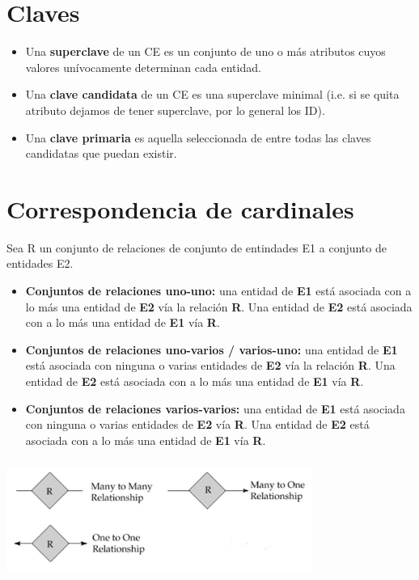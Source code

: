 \documentclass[12pt,a4paper]{report}
\begin{document}
	\section{Claves}
		\begin{itemize}
			\item Una \textbf{superclave} de un CE es un conjunto de uno o más atributos cuyos valores unívocamente determinan cada entidad.
			\item Una \textbf{clave candidata} de un CE es una superclave minimal (i.e. si se quita atributo dejamos de tener superclave, por lo general los ID).
			\item Una \textbf{clave primaria} es aquella seleccionada de entre todas las claves candidatas que puedan existir.
		\end{itemize}
		
	\section{Correspondencia de cardinales}
		\par Sea R un conjunto de relaciones de conjunto de entindades E1 a conjunto de entidades E2.
		\begin{itemize}
			\item \textbf{Conjuntos de relaciones uno-uno:} una entidad de \textbf{E1} está asociada con a lo más una entidad de \textbf{E2} vía la relación \textbf{R}. Una entidad de \textbf{E2} está asociada con a lo más una entidad de \textbf{E1} vía \textbf{R}.
			\item \textbf{Conjuntos de relaciones uno-varios / varios-uno:} una entidad de \textbf{E1} está asociada con ninguna o varias entidades de \textbf{E2} vía la relación \textbf{R}. Una entidad de \textbf{E2} está asociada con a lo más una entidad de \textbf{E1} vía \textbf{R}.
			\item \textbf{Conjuntos de relaciones varios-varios:} una entidad de \textbf{E1} está asociada con ninguna o varias entidades de \textbf{E2} vía \textbf{R}. Una entidad de \textbf{E2} está asociada con a lo más una entidad de \textbf{E1} vía \textbf{R}.
		\end{itemize}
		
		\begin{center}
			\includegraphics[width=10cm, height=4cm]{./imagenes/correspondencia.png}
		\end{center}
		
\end{document}
